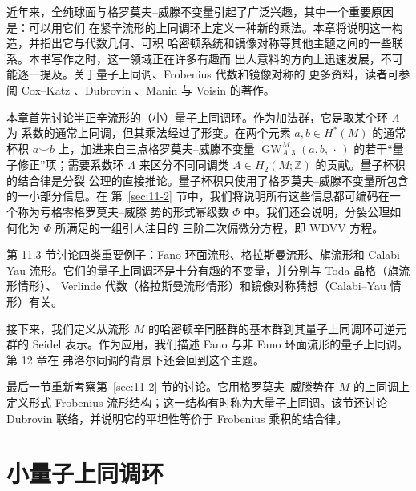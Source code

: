 
近年来，全纯球面与格罗莫夫--威滕不变量引起了广泛兴趣，其中一个重要原因是：可以用它们
在紧辛流形的上同调环上定义一种新的乘法。本章将说明这一构造，并指出它与代数几何、可积
哈密顿系统和镜像对称等其他主题之间的一些联系。本书写作之时，这一领域正在许多有趣而
出人意料的方向上迅速发展，不可能逐一提及。关于量子上同调、Frobenius 代数和镜像对称的
更多资料，读者可参阅 Cox--Katz 、Dubrovin 、Manin
 与 Voisin  的著作。

本章首先讨论半正辛流形的（小）量子上同调环。作为加法群，它是取某个环 $\Lambda$ 为
系数的通常上同调，但其乘法经过了形变。在两个元素 $a,b\in H^*(M)$ 的通常杯积
$a\smile b$ 上，加进来自三点格罗莫夫--威滕不变量
$\operatorname{GW}_{A,3}^M(a,b,\,\cdot\,)$ 的若干“量子修正”项；需要系数环
$\Lambda$ 来区分不同同调类 $A\in H_2(M;\mathbb Z)$ 的贡献。量子杯积的结合律是分裂
公理的直接推论。量子杯积只使用了格罗莫夫--威滕不变量所包含的一小部分信息。在
第~\ref{sec:11-2} 节中，我们将说明所有这些信息都可编码在一个称为亏格零格罗莫夫--威滕
势的形式幂级数 $\Phi$ 中。我们还会说明，分裂公理如何化为 $\Phi$ 所满足的一组引人注目的
三阶二次偏微分方程，即 WDVV 方程。

第 11.3 节讨论四类重要例子：Fano 环面流形、格拉斯曼流形、旗流形和 Calabi--Yau
流形。它们的量子上同调环是十分有趣的不变量，并分别与 Toda 晶格（旗流形情形）、
Verlinde 代数（格拉斯曼流形情形）和镜像对称猜想（Calabi--Yau 情形）有关。

接下来，我们定义从流形 $M$ 的哈密顿辛同胚群的基本群到其量子上同调环可逆元群的
Seidel 表示。作为应用，我们描述 Fano 与非 Fano 环面流形的量子上同调。第 12 章在
弗洛尔同调的背景下还会回到这个主题。

最后一节重新考察第~\ref{sec:11-2} 节的讨论。它用格罗莫夫--威滕势在 $M$ 的上同调上
定义形式 Frobenius 流形结构；这一结构有时称为大量子上同调。该节还讨论 Dubrovin
联络，并说明它的平坦性等价于 Frobenius 乘积的结合律。

\section{小量子上同调环}\label{sec:11-1}

